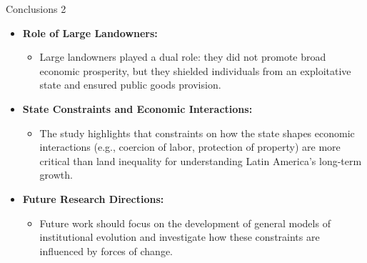 \documentclass[notes,11pt, aspectratio=169]{beamer}
\begin{document}
\begin{frame}{Conclusions 2}
    \begin{itemize}
        \item \textbf{Role of Large Landowners:}
            \begin{itemize}
                \item Large landowners played a dual role: they did not promote broad economic prosperity, but they shielded individuals from an exploitative state and ensured public goods provision.
            \end{itemize}
        \item \textbf{State Constraints and Economic Interactions:}
            \begin{itemize}
                \item The study highlights that constraints on how the state shapes economic interactions (e.g., coercion of labor, protection of property) are more critical than land inequality for understanding Latin America's long-term growth.
            \end{itemize}
        \item \textbf{Future Research Directions:}
            \begin{itemize}
                \item Future work should focus on the development of general models of institutional evolution and investigate how these constraints are influenced by forces of change.
            \end{itemize}
    \end{itemize}
\end{frame}
\end{document}
